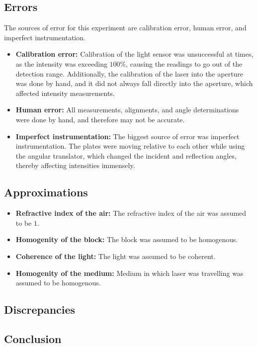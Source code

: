 \documentclass[10pt]{article}
\begin{document}
\subsection*{Errors}
The sources of error for this experiment are calibration error, human error, and imperfect instrumentation.
\begin{itemize}
  \item \textbf{Calibration error:} Calibration of the light sensor was unsuccessful at times, as the intensity was exceeding $100\%$, causing the readings to go out of the detection range. Additionally, the calibration of the laser into the aperture was done by hand, and it did not always fall directly into the aperture, which affected intensity measurements.
  \item \textbf{Human error:} All measurements, alignments, and angle determinations were done by hand, and therefore may not be accurate.
  \item \textbf{Imperfect instrumentation:} The biggest source of error was imperfect instrumentation. The plates were moving relative to each other while using the angular translator, which changed the incident and reflection angles, thereby affecting intensities immensely.
\end{itemize}

\subsection*{Approximations}
\begin{itemize}
  \item \textbf{Refractive index of the air:} The refractive index of the air was assumed to be $1$.
  \item \textbf{Homogenity of the block:} The block was assumed to be homogenous.
  \item \textbf{Coherence of the light:} The light was assumed to be coherent.
  \item \textbf{Homogenity of the medium:} Medium in which laser was travelling was assumed to be homogenous.
\end{itemize}

\subsection*{Discrepancies}

\subsection*{Conclusion} 
\end{document}

